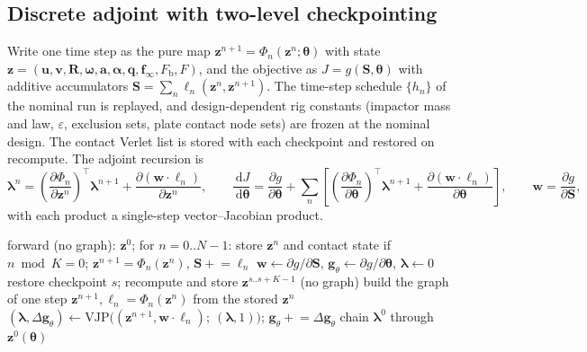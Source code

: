 \documentclass[11pt,a4paper]{article}
\newcommand{\vect}[1]{\bm{#1}}
\newcommand{\mat}[1]{\mathbf{#1}}
\newcommand{\dd}{\,\mathrm{d}}
\begin{document}
\subsection{Discrete adjoint with two-level checkpointing}
Write one time step as the pure map $\vect z^{n+1} = \Phi_n(\vect z^n;\vect\theta)$ with state
$\vect z = (\vect u,\vect v,\mat R,\vect\omega,\vect a,\vect\alpha,\vect q,\vect f_\infty,F_\mathrm{b},F)$, and
the objective as $J = g(\vect S,\vect\theta)$ with additive accumulators
$\vect S = \sum_n\vect\ell_n(\vect z^n,\vect z^{n+1})$. The time-step schedule $\{h_n\}$ of the nominal run is
replayed, and design-dependent rig constants (impactor mass and law, $\varepsilon$, exclusion sets, plate
contact node sets) are frozen at the nominal design. The contact Verlet list is stored with each checkpoint and
restored on recompute. The adjoint recursion is
\begin{equation}
\vect\lambda^n = \left(\frac{\partial\Phi_n}{\partial\vect z^n}\right)^{\!\top}\vect\lambda^{n+1}
+ \frac{\partial (\vect w\cdot\vect\ell_n)}{\partial\vect z^n},\qquad
\frac{\dd J}{\dd\vect\theta} = \frac{\partial g}{\partial\vect\theta}
+ \sum_n\left[\left(\frac{\partial\Phi_n}{\partial\vect\theta}\right)^{\!\top}\vect\lambda^{n+1}
+ \frac{\partial(\vect w\cdot\vect\ell_n)}{\partial\vect\theta}\right],\qquad \vect w = \frac{\partial g}{\partial\vect S},
\end{equation}
with each product a single-step vector--Jacobian product.

\begin{algorithm}[h]
\caption{Checkpointed discrete adjoint (\texttt{adjoint.checkpointed\_adjoint})}
\begin{algorithmic}[1]
\State forward (no graph): $\vect z^0$; for $n=0..N-1$: store $\vect z^n$ and contact state if $n \bmod K = 0$; $\vect z^{n+1}=\Phi_n(\vect z^n)$, $\vect S \mathrel{+}= \vect\ell_n$
\State $\vect w \gets \partial g/\partial\vect S$, $\vect g_\theta \gets \partial g/\partial\vect\theta$, $\vect\lambda\gets 0$
\For{segments $[s, s+K)$ from last to first}
  \State restore checkpoint $s$; recompute and store $\vect z^{s..s+K-1}$ (no graph)
    \State build the graph of one step $\vect z^{n+1},\vect\ell_n = \Phi_n(\vect z^n)$ from the stored $\vect z^n$
    \State $(\vect\lambda, \Delta\vect g_\theta) \gets \mathrm{VJP}\big((\vect z^{n+1}, \vect w\cdot\vect\ell_n);\ (\vect\lambda, 1)\big)$; $\vect g_\theta \mathrel{+}= \Delta\vect g_\theta$
  \EndFor
\EndFor
\State chain $\vect\lambda^0$ through $\vect z^0(\vect\theta)$
\end{algorithmic}
\end{algorithm}
\end{document}
